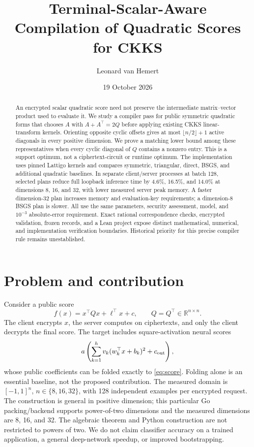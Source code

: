 \documentclass[10pt]{article}
\title{Terminal-Scalar-Aware Compilation of Quadratic Scores for CKKS}
\author{Leonard van Hemert}
\date{19 October 2026}
\newcommand{\R}{\mathbb R}
\begin{document}
\maketitle
\begin{abstract}
An encrypted scalar quadratic score need not preserve the intermediate matrix--vector product used to evaluate it. We study a compiler pass for public symmetric quadratic forms that chooses $A$ with $A+A^\top=2Q$ before applying existing CKKS linear-transform kernels. Orienting opposite cyclic offsets gives at most $\lfloor n/2\rfloor+1$ active diagonals in every positive dimension. We prove a matching lower bound among these representatives when every cyclic diagonal of $Q$ contains a nonzero entry. This is a support optimum, not a ciphertext-circuit or runtime optimum. The implementation uses pinned Lattigo kernels and compares symmetric, triangular, direct, BSGS, and additional quadratic baselines. In separate client/server processes at batch 128, selected plans reduce full loopback inference time by 4.6\%, 16.5\%, and 14.0\% at dimensions 8, 16, and 32, with lower measured server peak memory. A faster dimension-32 plan increases memory and evaluation-key requirements; a dimension-8 BSGS plan is slower. All use the same parameters, security assessment, model, and $10^{-3}$ absolute-error requirement. Exact rational correspondence checks, encrypted validation, frozen records, and a Lean project expose distinct mathematical, numerical, and implementation verification boundaries. Historical priority for this precise compiler rule remains unestablished.
\end{abstract}

\section{Problem and contribution}
Consider a public score
\begin{equation}\label{eq:score}
f(x)=x^\top Qx+\ell^\top x+c,\qquad Q=Q^\top\in\R^{n\times n}.
\end{equation}
The client encrypts $x$, the server computes on ciphertexts, and only the client decrypts the final score. The target includes square-activation neural scores
\[
a\left(\sum_{k=1}^{h}v_k(w_k^\top x+b_k)^2+c_{\rm out}\right),
\]
whose public coefficients can be folded exactly to \eqref{eq:score}. Folding alone is an essential baseline, not the proposed contribution. The measured domain is $[-1,1]^n$, $n\in\{8,16,32\}$, with 128 independent examples per encrypted request. The construction is general in positive dimension; this particular Go packing/backend supports power-of-two dimensions and the measured dimensions are 8, 16, and 32. The algebraic theorem and Python construction are not restricted to powers of two. We do not claim classifier accuracy on a trained application, a general deep-network speedup, or improved bootstrapping.
\end{document}
